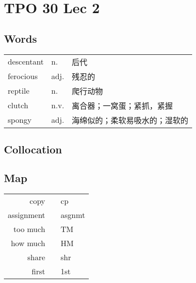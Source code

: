 \section{TPO 30 Lec 2}

\subsection{Words}

\begin{tabular}{lll}
    descentant & n. & 后代\\
    ferocious & adj. & 残忍的\\
    reptile & n. & 爬行动物\\
    clutch & n.v. & 离合器；一窝蛋；紧抓，紧握\\
    spongy & adj. & 海绵似的；柔软易吸水的；湿软的\\
\end{tabular}

\subsection{Collocation}

\subsection{Map}

\begin{tabular}{rc@{\quad$\to$\quad}l}
    copy && cp\\
    assignment && asgnmt\\
    too much && TM\\
    how much && HM\\
    share && shr\\
    first && 1st\\
\end{tabular}

\newpage
